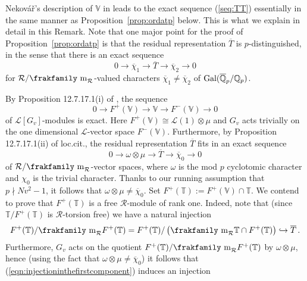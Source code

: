 \documentclass[12pt]{amsart}
\numberwithin{equation}{section}
\newenvironment{rem}{\par\medskip\noindent\refstepcounter{thm}
\bgroup{\hspace*{-0.15 cm}\bf{Remark} \thethm.}\bgroup}{\egroup
\egroup\par\medskip} \parskip 2pt
\begin{document}
\begin{rem}
\label{rem:fortheassholeref}
Nekov\'a\v{r}'s description of $\mathbb{V}$ in \cite[Proposition 12.7.17.1]{nek} leads to the exact sequence (\ref{seq:TT}) essentially in the same manner as Proposition~\ref{prop:ordatp} below. This is what we explain in detail in this Remark. Note that one major point for the proof of Proposition~\ref{prop:ordatp} is that the residual representation $\overline{T}$ is $p$-distinguished, in the sense that there is an exact sequence 
$$0{\longrightarrow}\overline{\chi}_1{\longrightarrow} \overline{T} {\longrightarrow} \overline{\chi}_2{\longrightarrow} 0$$
for $\mathcal{R}/{\hbox{\frakfamily m}}_{\mathcal{R}}$-valued characters $\overline{\chi}_1\neq\overline{\chi}_2$ of $\textup{Gal}(\overline{\mathbb{Q}}_p/{\mathbb{Q}}_p)$.

By Proposition 12.7.17.1(i) of \cite{nek}, the sequence 
$$0 {\longrightarrow}{F}^+(\mathbb{V}) {\longrightarrow} \mathbb{V} {\longrightarrow}{F}^-(\mathbb{V})  {\longrightarrow} 0$$
of $\mathcal{L}[G_v]$-modules is exact. Here ${F}^+(\mathbb{V}) \cong \mathcal{L}(1)\otimes\mu$ and $G_v$ acts trivially on the one dimensional ${\mathcal{L}}$-vector space ${F}^-(\mathbb{V})$. Furthermore, by Proposition 12.7.17.1(ii) of loc.cit., the residual representation $\overline{T}$ fits in an exact sequence 
$$0{\longrightarrow} \omega\otimes\mu {\longrightarrow} \overline{T} {\longrightarrow} \overline{\chi}_0{\longrightarrow} 0$$
of $\mathcal{R}/{\hbox{\frakfamily m}}_{\mathcal{R}}$-vector spaces, where $\omega$ is the mod $p$ cyclotomic character and $\chi_0$ is the trivial character. Thanks to our running assumption that $p\nmid Nv^2-1$, it follows that $ \omega\otimes\mu \neq  \overline{\chi}_0$. Set ${F}^+(\mathbb{T}):={F}^+(\mathbb{V})\cap \mathbb{T}$. We contend to prove that $F^+(\mathbb{T})$ is a  free $\mathcal{R}$-module of rank one. Indeed, note that (since ${\mathbb{T}}/F^+(\mathbb{T})$ is $\mathcal{R}$-torsion free) we have a natural injection 
\begin{equation}\label{eqn:injectioninthefirstcomponent}{F}^+(\mathbb{T})/{\hbox{\frakfamily m}}_{\mathcal{R}}{F}^+(\mathbb{T})= {F}^+(\mathbb{T})/\left({\hbox{\frakfamily m}}_{\mathcal{R}}{\mathbb{T}}\cap {F}^+(\mathbb{T})\right)\hookrightarrow \overline{T}\,.\end{equation}
Furthermore, $G_v$ acts on the quotient $F^+(\mathbb{T})/{\hbox{\frakfamily m}}_{\mathcal{R}}{F}^+(\mathbb{T})$ by $\omega\otimes\mu$, hence (using the fact that $\omega\otimes\mu \neq  \overline{\chi}_0$) it follows that (\ref{eqn:injectioninthefirstcomponent}) induces an injection

\end{rem}
\end{document}
